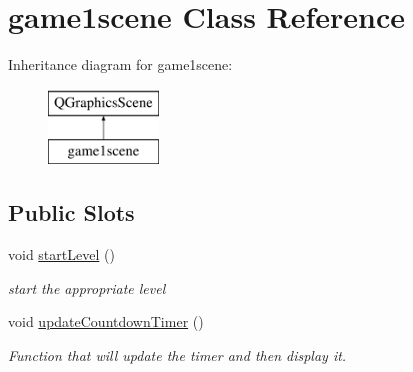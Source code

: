 \hypertarget{classgame1scene}{\section{game1scene Class Reference}
\label{classgame1scene}
}
Inheritance diagram for game1scene\-:\begin{figure}[H]
\begin{center}
\leavevmode
\includegraphics[height=2.000000cm]{classgame1scene}
\end{center}
\end{figure}
\subsection*{Public Slots}
\begin{DoxyCompactItemize}
\item 
void \hyperlink{classgame1scene_a2a94d8b07f6e0f122b59637f1dee8268}{start\-Level} ()
\begin{DoxyCompactList}\small\item\em start the appropriate level \end{DoxyCompactList}\item 
void \hyperlink{classgame1scene_a14c4c42a015d9fae66f80ca780794ee9}{update\-Countdown\-Timer} ()
\begin{DoxyCompactList}\small\item\em Function that will update the timer and then display it. \end{DoxyCompactList}\end{DoxyCompactItemize}
